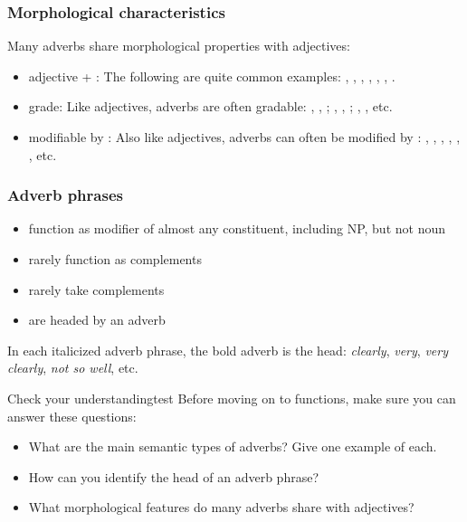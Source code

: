 \subsubsection*{Morphological characteristics}
Many adverbs share morphological properties with adjectives:
\begin{itemize}[noitemsep]
   \item adjective + : The following are quite common examples: , , , , , , .
   \item grade: Like adjectives, adverbs are often gradable: , , ; , , ; , , etc.
   \item modifiable by : Also like adjectives, adverbs can often be modified by : , , , , , , etc.
\end{itemize}

\subsubsection*{Adverb phrases}
\label{sec:advps}

\begin{itemize}[noitemsep]
   \item function as modifier of almost any constituent, including NP, but not noun
   \item rarely function as complements
   \item rarely take complements
   \item are headed by an adverb
\end{itemize}

In each italicized adverb phrase, the bold adverb is the head: \textit{\emph{clearly}}, \textit{\emph{very}}, \textit{very \emph{clearly}}, \textit{not so \emph{well}}, etc.

\begin{tblsframedsymbol}{Check your understanding}{test}
Before moving on to functions, make sure you can answer these questions:
\begin{itemize}[noitemsep, leftmargin=*]
    \item What are the main semantic types of adverbs? Give one example of each.
    \item How can you identify the head of an adverb phrase?
    \item What morphological features do many adverbs share with adjectives?
\end{itemize}
\end{tblsframedsymbol}

